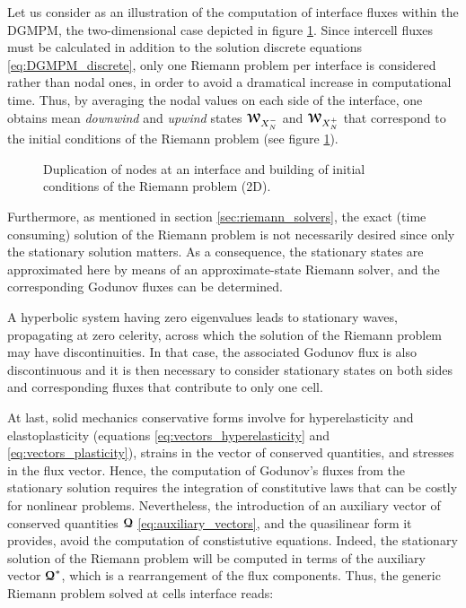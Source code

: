 Let us consider as an illustration of the computation of interface fluxes within the DGMPM, the two-dimensional case depicted in figure \ref{fig:2D_edge}. Since intercell fluxes must be calculated in addition to the solution discrete equations \eqref{eq:DGMPM_discrete}, only one Riemann problem per interface is considered rather than nodal ones, in order to avoid a dramatical increase in computational time. Thus, by averaging the nodal values on each side of the interface, one obtains mean \textit{downwind} and \textit{upwind} states ${\boldsymbol{\mathcal{W}}}_{X_N^-}$ and ${\boldsymbol{\mathcal{W}}}_{X_N^+}$ that correspond to the initial conditions of the Riemann problem (see figure \ref{fig:2D_edge}).
\begin{figure}[h!]
  \centering
  
  \caption{Duplication of nodes at an interface and building of initial conditions of the Riemann problem (2D).}
  \label{fig:2D_edge}
\end{figure}
Furthermore, as mentioned in section \ref{sec:riemann_solvers}, the exact (time consuming) solution of the Riemann problem is not necessarily desired since only the stationary solution matters. As a consequence, the stationary states are approximated here by means of an approximate-state Riemann solver, and the corresponding Godunov fluxes can be determined.
\begin{remark}
A hyperbolic system having zero eigenvalues leads to stationary waves, propagating at zero celerity, across which the solution of the Riemann problem may have discontinuities. In that case, the associated Godunov flux is also discontinuous and it is then necessary to consider stationary states on both sides and corresponding fluxes that contribute to only one cell. 
\end{remark}
At last, solid mechanics conservative forms involve for hyperelasticity and elastoplasticity (equations \eqref{eq:vectors_hyperelasticity} and \eqref{eq:vectors_plasticity}), strains in the vector of conserved quantities, and stresses in the flux vector. Hence, the computation of Godunov's fluxes from the stationary solution requires the integration of constitutive laws that can be costly for nonlinear problems. Nevertheless, the introduction of an auxiliary vector of conserved quantities ${\boldsymbol{\mathcal{Q}}}$ \eqref{eq:auxiliary_vectors}, and the quasilinear form it provides, avoid the computation of constistutive equations. Indeed, the stationary solution of the Riemann problem will be computed in terms of the auxiliary vector ${\boldsymbol{\mathcal{Q}}}^*$, which is a rearrangement of the flux components. Thus, the generic Riemann problem solved at cells interface reads:

